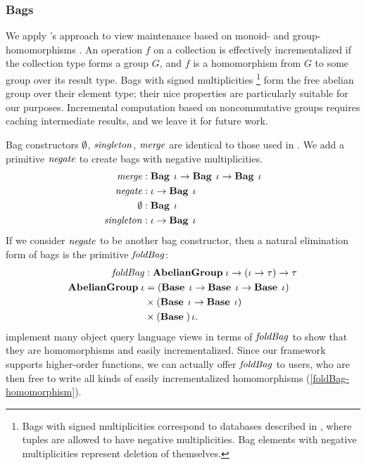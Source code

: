 \begin{oldSec}
\subsubsection{Bags}

We apply \citeauthor{GlucheGrust97Incr}'s approach to view
maintenance based on monoid- and group-homomorphisms
\citep{GlucheGrust97Incr}. An operation $f$ on a collection is
effectively incrementalized if the collection type forms a group
$G$, and $f$ is a homomorphism from $G$ to some group over its
result type. Bags with signed multiplicities%
%
\footnote{Bags with signed multiplicities correspond to databases
described in \citet{Koch10IQE}, where tuples are allowed to have
negative multiplicities. Bag elements with negative
multiplicities represent deletion of themselves.}
%
form the free abelian group over their element type; their nice
properties are particularly suitable for our purposes.
Incremental computation based on noncommutative groups requires
caching intermediate results, and we leave it for future work.

Bag constructors $\Empty$, $\mathit{singleton}$, $\mathit{merge}$ are identical
to those used in \citet{GlucheGrust97Incr}. We add a primitive
$\mathit{negate}$ to create bags with negative multiplicities.
\begin{align*}
\HasTypeAligned{\MERGE}
  {\Fun{\Fun{\Bag[\Gi]}{\Bag[\Gi]}}{\Bag[\Gi]}}
\\
\HasTypeAligned{\NEGATE}
  {\Fun{\Gi}{\Bag[\Gi]}}
\\
\HasTypeAligned{\Empty}
  {\Bag[\Gi]}
\\
\HasTypeAligned{\SINGLETON}
  {\Fun{\Gi}{\Bag[\Gi]}}
\end{align*}
If we consider $\mathit{negate}$ to be another bag constructor, then a
natural elimination form of bags is the primitive $\mathit{foldBag}$:
\begin{align*}
\HasTypeAligned\FOLDBAG
  {\Fun {\Abelian \Gi}
    {\Fun {\Fun*{\Gi}{\Gt}} {\Gt}}}
\\
\Abelian\Gi
  & =      \Fun*{\Base\Gi}{\Fun{\Base\Gi}{\Base\Gi}} \\
  & \times \Fun*{\Base\Gi}{\Base\Gi} \\
  & \times \Base*\Gi.
\end{align*}
\citet{GlucheGrust97Incr} implement many object query language
views in terms of $\mathit{foldBag}$ to show that they are
homomorphisms and easily incrementalized. Since our framework
supports higher-order functions, we can actually offer
$\mathit{foldBag}$ to users, who are then free to write all kinds of
easily incrementalized homomorphisms
(\cref{foldBag-homomorphism}).


\end{oldSec}
